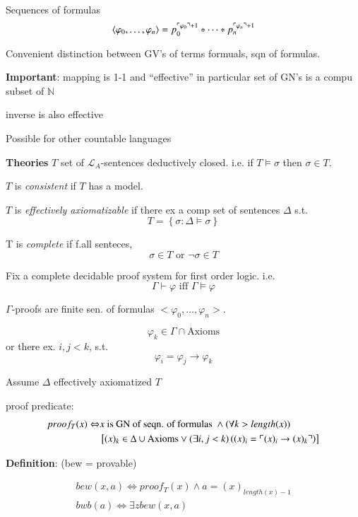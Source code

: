 \documentclass[12pt]{article}
\newcommand{\Nat}{\ensuremath{\mathbb{N}}}
\newcommand{\defn}{\textbf{Definition}: }
\begin{document}
Sequences of formulas
\[
 \langle \varphi_0, \dots, \varphi_n \rangle 
 = p_0^{\ulcorner \varphi_0 \urcorner + 1} * \dots * p_n^{\ulcorner \varphi_n \urcorner + 1}
\]

Convenient distinction between GV's of terms formuals, sqn of formulas.

\textbf{Important}: mapping is 1-1 and ``effective''
in particular set of GN's is a compu subset of $\Nat$

inverse is also effective

Possible for other countable languages


\textbf{Theories}
$T$ set of $\mathcal{L}_A$-sentences deductively closed.  
i.e. if $T \models \sigma$ then $\sigma \in T$.


$T$ is \emph{consistent} if $T$ has a model.

$T$ is \emph{effectively axiomatizable} if there ex a comp set of sentences 
$\Delta$ s.t.
\[
T = \left\{\sigma : \Delta \models \sigma \right\}
\]

T is \emph{complete} if f.all senteces,
\[
\sigma \in T \text{ or } \neg \sigma \in T
\]

Fix a complete decidable proof system for first order logic.
i.e.
\newcommand{\proves}{\vdash}
\[
\Gamma \proves \varphi \text{ iff } \Gamma \models \varphi
\]

$\Gamma$-proofs are finite sen. of formulas $<\varphi_0, \dots, \varphi_n >$.

\[
\varphi_k \in \Gamma \cap \text{Axioms}
\]
or there ex. $i,j < k$, s.t.
\[
\varphi_i = \varphi_j \rightarrow \varphi_k
\]

Assume $\Delta$ effectively axiomatized $T$

proof predicate:
\begin{align*}
  proof_T(x) \Leftrightarrow& x \text{ is GN of seqn. of formulas } 
  \wedge (\forall k > length(x) ) \\
  &\left[ (x)_k \in \Delta \cup \text{Axioms} \vee (\exists i,j < k) \left( (x)_i = \ulcorner (x)_i \rightarrow (x)_k \urcorner\right) \right]
\end{align*}

\defn
(bew = provable)

\begin{align*}
  bew(x,a) \Leftrightarrow proof_T(x) \wedge a =  (x)_{length(x)-1} \\
  bwb(a) \Leftrightarrow \exists z bew(x,a)
\end{align*}
\end{document}
